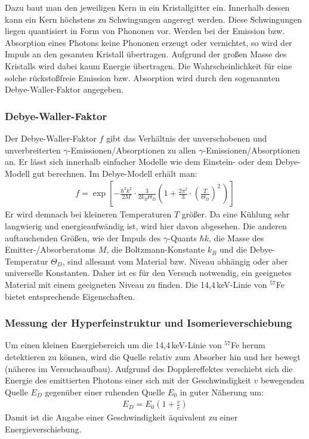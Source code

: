 	Dazu baut man den jeweiligen Kern in ein Kristallgitter ein. Innerhalb dessen kann ein Kern höchstens zu Schwingungen angeregt werden. Diese Schwingungen liegen quantisiert in Form von Phononen vor. Werden bei der Emission bzw. Absorption eines Photons keine Phononen erzeugt oder vernichtet, so wird der Impuls an den gesamten Kristall übertragen. Aufgrund der großen Masse des Kristalls wird dabei kaum Energie übertragen. Die Wahrscheinlichkeit für eine solche rückstoßfreie Emission bzw. Absorption wird durch den sogenannten Debye-Waller-Faktor angegeben. 
	
	\subsubsection{Debye-Waller-Faktor}
	
	Der Debye-Waller-Faktor $f$ gibt das Verhältnis der unverschobenen und unverbreiterten $\gamma$-Emissionen/Absorptionen zu allen $\gamma$-Emissionen/Absorptionen an. Er lässt sich innerhalb einfacher Modelle wie dem Einstein- oder dem Debye-Modell gut berechnen. Im Debye-Modell erhält man:
	\begin{align}
		f=\exp\left[ -\frac{\hbar^2k^2}{2M}\cdot\frac{3}{2k_B\Theta_D}\left( 1+\frac{2\pi^2}{3}\cdot\left( \frac{T}{\Theta_D}\right)^2\, \right) \right]
	\end{align}
	Er wird demnach bei kleineren Temperaturen $T$ größer. Da eine Kühlung sehr langwierig und energieaufwändig ist, wird hier davon abgesehen. Die anderen auftauchenden Größen, wie der Impuls des $\gamma$-Quants $\hbar k$, die Masse des Emitter-/Absorberatoms $M$, die Boltzmann-Konstante $k_B$ und die Debye-Temperatur $\Theta_D$, sind allesamt vom Material bzw. Niveau abhängig oder aber universelle Konstanten. Daher ist es für den Versuch notwendig, ein geeignetes Material mit einem geeigneten Niveau zu finden. Die 14,4\,keV-Linie von $^{57}$Fe bietet entsprechende Eigenschaften.
	
	\subsubsection{Messung der Hyperfeinstruktur und Isomerieverschiebung}
	
	Um einen kleinen Energiebereich um die 14,4\,keV-Linie von $^{57}$Fe herum detektieren zu können, wird die Quelle relativ zum Absorber hin und her bewegt (näheres im Versuchsaufbau). Aufgrund des Dopplereffektes verschiebt sich die Energie des emittierten Photons einer sich mit der Geschwindigkeit $v$ bewegenden Quelle $E_D$ gegenüber einer ruhenden Quelle $E_0$ in guter Näherung um:
	\begin{align}
		E_D=E_0\left( 1+\frac{v}{c}\right) 
	\end{align}
	Damit ist die Angabe einer Geschwindigkeit äquivalent zu einer Energieverschiebung.
	
